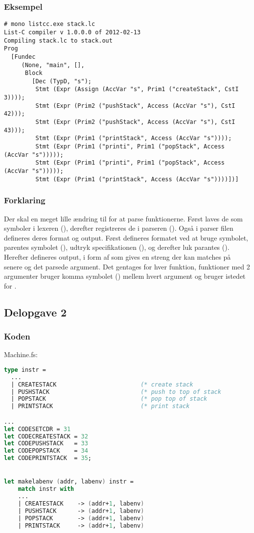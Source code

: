 \subsubsection{Eksempel}
\begin{lstlisting}
# mono listcc.exe stack.lc
List-C compiler v 1.0.0.0 of 2012-02-13
Compiling stack.lc to stack.out
Prog
  [Fundec
     (None, "main", [],
      Block
        [Dec (TypD, "s");
         Stmt (Expr (Assign (AccVar "s", Prim1 ("createStack", CstI 3))));
         Stmt (Expr (Prim2 ("pushStack", Access (AccVar "s"), CstI 42)));
         Stmt (Expr (Prim2 ("pushStack", Access (AccVar "s"), CstI 43)));
         Stmt (Expr (Prim1 ("printStack", Access (AccVar "s"))));
         Stmt (Expr (Prim1 ("printi", Prim1 ("popStack", Access (AccVar "s")))));
         Stmt (Expr (Prim1 ("printi", Prim1 ("popStack", Access (AccVar "s")))));
         Stmt (Expr (Prim1 ("printStack", Access (AccVar "s"))))])]
\end{lstlisting}

\subsubsection{Forklaring}
Der skal en meget lille ændring til for at parse funktionerne. Først laves de som symboler i lexeren (), derefter registreres de i parseren (). Også i parser filen defineres deres format og output. Først defineres formatet ved at bruge symbolet, parentes symbolet (), udtryk specifikationen (), og derefter luk parantes (). Herefter defineres output, i form af  som gives en streng der kan matches på senere og det parsede argument. Det gentages for hver funktion, funktioner med 2 argumenter bruger komma symbolet () mellem hvert argument og bruger  istedet for .

\subsection{Delopgave 2}\label{ass:2-2}
\subsubsection{Koden}
Machine.fs:
\begin{lstlisting}[language=fsharp]
type instr =
  ...
  | CREATESTACK                        (* create stack                    *)
  | PUSHSTACK                          (* push to top of stack            *)
  | POPSTACK                           (* pop top of stack                *)
  | PRINTSTACK                         (* print stack                     *)

...
let CODESETCDR = 31
let CODECREATESTACK = 32
let CODEPUSHSTACK   = 33
let CODEPOPSTACK    = 34
let CODEPRINTSTACK  = 35;


let makelabenv (addr, labenv) instr = 
    match instr with
    ...
    | CREATESTACK    -> (addr+1, labenv)
    | PUSHSTACK      -> (addr+1, labenv)
    | POPSTACK       -> (addr+1, labenv)
    | PRINTSTACK     -> (addr+1, labenv)
\end{lstlisting}

